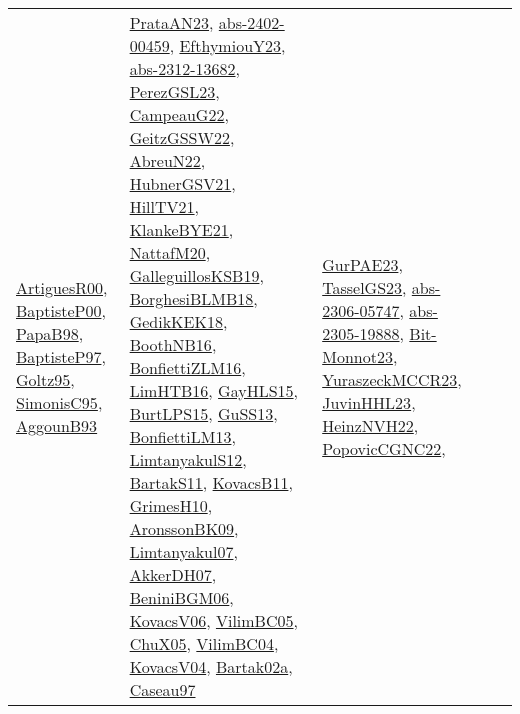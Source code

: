 {\begin{longtable}{lp{3cm}>{\raggedright}p{6cm}>{\raggedright}p{6cm}p{8cm}}
\href{articles/ArtiguesR00.pdf}{ArtiguesR00}\cite{ArtiguesR00}, \href{articles/BaptisteP00.pdf}{BaptisteP00}\cite{BaptisteP00}, \href{articles/PapaB98.pdf}{PapaB98}\cite{PapaB98}, \href{papers/BaptisteP97.pdf}{BaptisteP97}\cite{BaptisteP97}, \href{papers/Goltz95.pdf}{Goltz95}\cite{Goltz95}, \href{papers/SimonisC95.pdf}{SimonisC95}\cite{SimonisC95}, \href{articles/AggounB93.pdf}{AggounB93}\cite{AggounB93} & \href{articles/PrataAN23.pdf}{PrataAN23}\cite{PrataAN23}, \href{articles/abs-2402-00459.pdf}{abs-2402-00459}\cite{abs-2402-00459}, \href{papers/EfthymiouY23.pdf}{EfthymiouY23}\cite{EfthymiouY23}, \href{articles/abs-2312-13682.pdf}{abs-2312-13682}\cite{abs-2312-13682}, \href{papers/PerezGSL23.pdf}{PerezGSL23}\cite{PerezGSL23}, \href{articles/CampeauG22.pdf}{CampeauG22}\cite{CampeauG22}, \href{papers/GeitzGSSW22.pdf}{GeitzGSSW22}\cite{GeitzGSSW22}, \href{articles/AbreuN22.pdf}{AbreuN22}\cite{AbreuN22}, \href{articles/HubnerGSV21.pdf}{HubnerGSV21}\cite{HubnerGSV21}, \href{papers/HillTV21.pdf}{HillTV21}\cite{HillTV21}, \href{papers/KlankeBYE21.pdf}{KlankeBYE21}\cite{KlankeBYE21}, \href{papers/NattafM20.pdf}{NattafM20}\cite{NattafM20}, \href{papers/GalleguillosKSB19.pdf}{GalleguillosKSB19}\cite{GalleguillosKSB19}, \href{articles/BorghesiBLMB18.pdf}{BorghesiBLMB18}\cite{BorghesiBLMB18}, \href{articles/GedikKEK18.pdf}{GedikKEK18}\cite{GedikKEK18}, \href{papers/BoothNB16.pdf}{BoothNB16}\cite{BoothNB16}, \href{papers/BonfiettiZLM16.pdf}{BonfiettiZLM16}\cite{BonfiettiZLM16}, \href{papers/LimHTB16.pdf}{LimHTB16}\cite{LimHTB16}, \href{papers/GayHLS15.pdf}{GayHLS15}\cite{GayHLS15}, \href{papers/BurtLPS15.pdf}{BurtLPS15}\cite{BurtLPS15}, \href{papers/GuSS13.pdf}{GuSS13}\cite{GuSS13}, \href{papers/BonfiettiLM13.pdf}{BonfiettiLM13}\cite{BonfiettiLM13}, \href{articles/LimtanyakulS12.pdf}{LimtanyakulS12}\cite{LimtanyakulS12}, \href{articles/BartakS11.pdf}{BartakS11}\cite{BartakS11}, \href{articles/KovacsB11.pdf}{KovacsB11}\cite{KovacsB11}, \href{papers/GrimesH10.pdf}{GrimesH10}\cite{GrimesH10}, \href{papers/AronssonBK09.pdf}{AronssonBK09}\cite{AronssonBK09}, \href{papers/Limtanyakul07.pdf}{Limtanyakul07}\cite{Limtanyakul07}, \href{papers/AkkerDH07.pdf}{AkkerDH07}\cite{AkkerDH07}, \href{papers/BeniniBGM06.pdf}{BeniniBGM06}\cite{BeniniBGM06}, \href{papers/KovacsV06.pdf}{KovacsV06}\cite{KovacsV06}, \href{articles/VilimBC05.pdf}{VilimBC05}\cite{VilimBC05}, \href{papers/ChuX05.pdf}{ChuX05}\cite{ChuX05}, \href{papers/VilimBC04.pdf}{VilimBC04}\cite{VilimBC04}, \href{papers/KovacsV04.pdf}{KovacsV04}\cite{KovacsV04}, \href{papers/Bartak02a.pdf}{Bartak02a}\cite{Bartak02a}, \href{papers/Caseau97.pdf}{Caseau97}\cite{Caseau97} & \href{articles/GurPAE23.pdf}{GurPAE23}\cite{GurPAE23}, \href{papers/TasselGS23.pdf}{TasselGS23}\cite{TasselGS23}, \href{articles/abs-2306-05747.pdf}{abs-2306-05747}\cite{abs-2306-05747}, \href{articles/abs-2305-19888.pdf}{abs-2305-19888}\cite{abs-2305-19888}, \href{papers/Bit-Monnot23.pdf}{Bit-Monnot23}\cite{Bit-Monnot23}, \href{articles/YuraszeckMCCR23.pdf}{YuraszeckMCCR23}\cite{YuraszeckMCCR23}, \href{papers/JuvinHHL23.pdf}{JuvinHHL23}\cite{JuvinHHL23}, \href{articles/HeinzNVH22.pdf}{HeinzNVH22}\cite{HeinzNVH22}, \href{papers/PopovicCGNC22.pdf}{PopovicCGNC22}\cite{PopovicCGNC22}, 
\end{longtable}}
